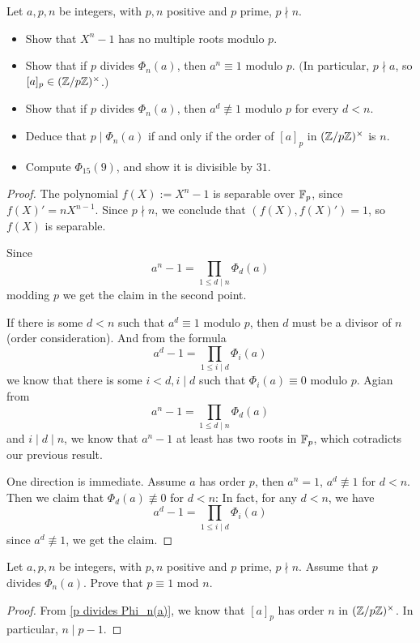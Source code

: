 \begin{exercise}\label{p divides Phi_n(a)}
Let $a,p,n$ be integers, with $p,n$ positive and $p$ prime, $p\nmid n$.
\begin{itemize}
\item Show that $X^n-1$ has no multiple roots modulo $p$.
\item Show that if $p$ divides $\Phi_n(a)$, then $a^n\equiv1$ modulo $p$. $($In particular, $p\nmid a$, so $[a]_p\in(\mathbb{Z}/p\mathbb{Z})^{\times}$.$)$
\item Show that if $p$ divides $\Phi_n(a)$, then $a^d\not\equiv1$ modulo $p$ for every $d<n$.
\item Deduce that $p\mid\Phi_n(a)$ if and only if the order of $[a]_p$ in $(\mathbb{Z}/p\mathbb{Z})^{\times}$ is $n$.
\item Compute $\Phi_{15}(9)$, and show it is divisible by $31$.
\end{itemize}
\end{exercise}
\begin{proof}
The polynomial $f(X):=X^n-1$ is separable over $\mathbb{F}_p$, since $f(X)'=nX^{n-1}$. Since $p\nmid n$, we conclude that $(f(X),f(X)')=1$, so $f(X)$ is separable.\par
Since 
\[a^n-1=\prod_{1\leq d\mid n}\Phi_d(a)\]
modding $p$ we get the claim in the second point.\par
If there is some $d<n$ such that $a^d\equiv1$ modulo $p$, then $d$ must be a divisor of $n$ (order consideration). And from the formula
\[a^d-1=\prod_{1\leq i\mid d}\Phi_i(a)\]
we know that there is some $i<d, i\mid d$ such that $\Phi_i(a)\equiv 0$ modulo $p$. Agian from 
\[a^n-1=\prod_{1\leq d\mid n}\Phi_d(a)\]
and $i\mid d\mid n$, we know that $a^n-1$ at least has two roots in $\mathbb{F}_p$, which cotradicts our previous result.\par
One direction is immediate. Assume $a$ has order $p$, then $a^n=1$, $a^d\not\equiv1$ for $d<n$. Then we claim that $\Phi_d(a)\not\equiv 0$ for $d<n$: In fact, for any $d<n$, we have
\[a^d-1=\prod_{1\leq i\mid d}\Phi_i(a)\]
since $a^d\not\equiv 1$, we get the claim.
\end{proof}
\begin{exercise}
Let $a,p,n$ be integers, with $p,n$ positive and $p$ prime, $p\nmid n$. Assume that $p$ divides $\Phi_n(a)$. Prove that $p\equiv1$ mod $n$.
\end{exercise}
\begin{proof}
From \cref{p divides Phi_n(a)}, we know that $[a]_p$ has order $n$ in $(\mathbb{Z}/p\mathbb{Z})^{\times}$. In particular, $n\mid p-1$.
\end{proof}
